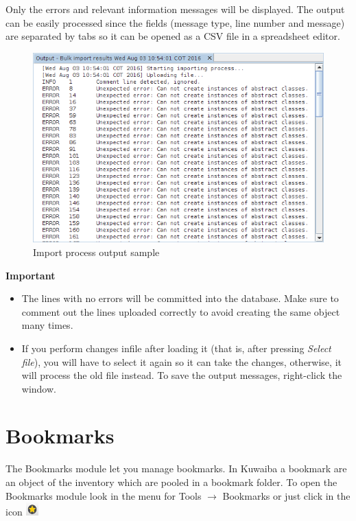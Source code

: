 \documentclass[a4paper]{article}
\begin{document}
				Only the errors and relevant information messages will be displayed. The output can be easily processed since the fields (message type, line number and message)	are separated by tabs so it can be opened as a CSV file in a spreadsheet editor. 
				
				\begin{figure}[h!]
					\centering
					\includegraphics[width=0.7\linewidth]{img/bulk_import_output_window.png}
					\caption{Import process output sample}
					\label{fig:bulk_import_output_window}
				\end{figure}	
				
				\newpage
				\begin{framed} {\large \textbf{Important}}
					\begin{itemize}
					\item The lines with no errors will be committed into the database. Make sure to comment out the lines uploaded correctly to avoid creating the same object many times.
					
					\item If you perform changes infile after loading it (that is, after pressing \textit{Select file}), you will have to select it again so it can take the changes, otherwise, it will process the old file instead. To save the output messages, right-click the window.
					\end{itemize}
				\end{framed}
		\newpage
		\section{Bookmarks}\label{sec:bookmarks}
		
			The Bookmarks module let you manage bookmarks. In Kuwaiba a bookmark are an object of the inventory which are pooled in a bookmark folder. To open the Bookmarks module look in the menu for Tools $\rightarrow$ Bookmarks or just click in the icon
			\includegraphics[width=0.5cm]{img/icon_bookmarks.png}
			
\end{document}
